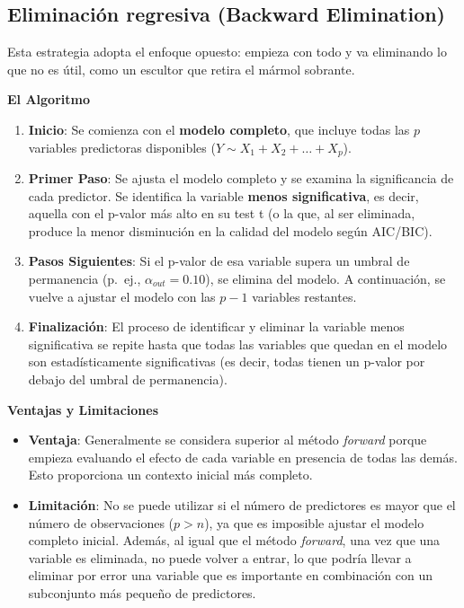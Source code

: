 \documentclass[
  letterpaper,
  DIV=11,
  numbers=noendperiod]{scrreprt}
\providecommand{\tightlist}{%
  \setlength{\itemsep}{0pt}\setlength{\parskip}{0pt}}
\begin{document}
\subsection{Eliminación regresiva (Backward
Elimination)}\label{eliminaciuxf3n-regresiva-backward-elimination}

Esta estrategia adopta el enfoque opuesto: empieza con todo y va
eliminando lo que no es útil, como un escultor que retira el mármol
sobrante.

\textbf{El Algoritmo}

\begin{enumerate}
\def\labelenumi{\arabic{enumi}.}
\tightlist
\item
  \textbf{Inicio}: Se comienza con el \textbf{modelo completo}, que
  incluye todas las \(p\) variables predictoras disponibles
  (\(Y \sim X_1 + X_2 + \dots + X_p\)).
\item
  \textbf{Primer Paso}: Se ajusta el modelo completo y se examina la
  significancia de cada predictor. Se identifica la variable
  \textbf{menos significativa}, es decir, aquella con el p-valor más
  alto en su test t (o la que, al ser eliminada, produce la menor
  disminución en la calidad del modelo según AIC/BIC).
\item
  \textbf{Pasos Siguientes}: Si el p-valor de esa variable supera un
  umbral de permanencia (p.~ej., \(\alpha_{out} = 0.10\)), se elimina
  del modelo. A continuación, se vuelve a ajustar el modelo con las
  \(p-1\) variables restantes.
\item
  \textbf{Finalización}: El proceso de identificar y eliminar la
  variable menos significativa se repite hasta que todas las variables
  que quedan en el modelo son estadísticamente significativas (es decir,
  todas tienen un p-valor por debajo del umbral de permanencia).
\end{enumerate}

\textbf{Ventajas y Limitaciones}

\begin{itemize}
\tightlist
\item
  \textbf{Ventaja}: Generalmente se considera superior al método
  \emph{forward} porque empieza evaluando el efecto de cada variable en
  presencia de todas las demás. Esto proporciona un contexto inicial más
  completo.
\item
  \textbf{Limitación}: No se puede utilizar si el número de predictores
  es mayor que el número de observaciones (\(p > n\)), ya que es
  imposible ajustar el modelo completo inicial. Además, al igual que el
  método \emph{forward}, una vez que una variable es eliminada, no puede
  volver a entrar, lo que podría llevar a eliminar por error una
  variable que es importante en combinación con un subconjunto más
  pequeño de predictores.
\end{itemize}
\end{document}
